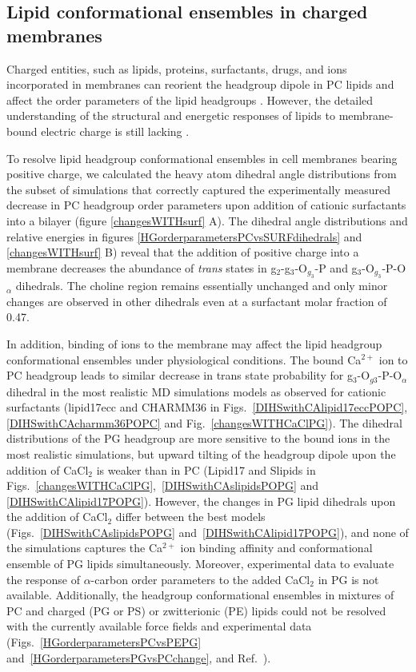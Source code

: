 \documentclass[aps,prl,superscriptaddress,twocolumn]{revtex4}
\begin{document}
\subsection{Lipid conformational ensembles in charged membranes}

Charged entities, such as lipids, proteins, surfactants, drugs, and ions incorporated in membranes can reorient the headgroup dipole in PC lipids and affect the order parameters of the lipid headgroups \cite{seelig87}. However, the detailed understanding of the structural and energetic responses of lipids to membrane-bound electric charge is still lacking \cite{Semchyschyn04}.

To resolve lipid headgroup conformational ensembles in cell membranes bearing positive charge,
we calculated the heavy atom dihedral angle distributions from 
the subset of simulations %
that correctly captured the experimentally measured decrease in PC headgroup order parameters upon addition of cationic surfactants into a bilayer (figure \ref{changesWITHsurf} A).
The dihedral angle distributions and relative energies
in figures \ref{HGorderparametersPCvsSURFdihedrals} and \ref{changesWITHsurf} B) reveal that the
addition of positive charge into a membrane 
decreases the abundance of \textit{trans} states in g$_2$-g$_3$-O$_{g_3}$-P and g$_3$-O$_{g_3}$-P-O$_\alpha$
dihedrals.
The choline region remains essentially unchanged and only minor changes are observed in other dihedrals even at a surfactant molar fraction of 0.47.

In addition, binding of ions to the membrane may affect the lipid headgroup conformational ensembles under physiological conditions.
The bound Ca$^{2+}$ ion to PC headgroup leads to similar decrease in trans state probability for g$_3$-O$_{g3}$-P-O$_\alpha$ dihedral
in the most realistic MD simulations models
as observed for cationic surfactants
(lipid17ecc and CHARMM36 in Figs.~\ref{DIHSwithCAlipid17eccPOPC}, \ref{DIHSwithCAcharmm36POPC} and Fig.~\ref{changesWITHCaClPG}).
The dihedral distributions of the PG headgroup are more sensitive to the bound ions in the most realistic simulations,
but upward tilting of the headgroup dipole upon the addition of CaCl$_2$ is weaker than in PC
(Lipid17 and Slipids in Figs.~\ref{changesWITHCaClPG},~\ref{DIHSwithCAslipidsPOPG} and \ref{DIHSwithCAlipid17POPG}).
However, the changes in PG lipid dihedrals upon the addition of CaCl$_2$ differ between the best models (Figs.~\ref{DIHSwithCAslipidsPOPG} and~\ref{DIHSwithCAlipid17POPG}), and none of the simulations captures the Ca$^{2+}$ ion binding affinity and conformational ensemble of PG lipids simultaneously. Moreover, experimental data to evaluate the response of $\alpha$-carbon order parameters to the added CaCl$_2$ in PG is not available.
Additionally, the headgroup conformational ensembles in mixtures of PC and charged (PG or PS) or zwitterionic (PE)
lipids could not be resolved with the currently available force fields and experimental data
(Figs.~\ref{HGorderparametersPCvsPEPG} and~\ref{HGorderparametersPGvsPCchange}, and Ref.~\cite{antila19,melcr20}).
\end{document}
